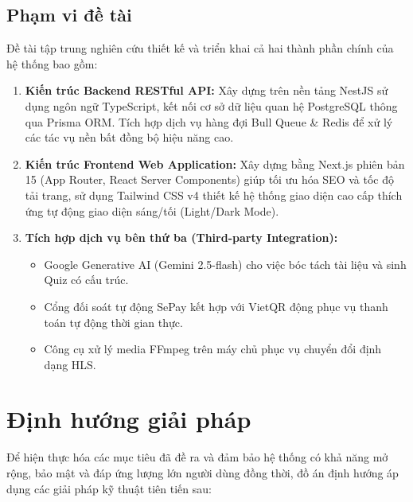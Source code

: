 \documentclass[../main.tex]{subfiles}
\begin{document}
\subsection{Phạm vi đề tài}
\label{subsec:PhamVi}

Đề tài tập trung nghiên cứu thiết kế và triển khai cả hai thành phần chính của hệ thống bao gồm:
\begin{enumerate}
    \item \textbf{Kiến trúc Backend RESTful API:} Xây dựng trên nền tảng NestJS sử dụng ngôn ngữ TypeScript, kết nối cơ sở dữ liệu quan hệ PostgreSQL thông qua Prisma ORM. Tích hợp dịch vụ hàng đợi Bull Queue & Redis để xử lý các tác vụ nền bất đồng bộ hiệu năng cao.
    \item \textbf{Kiến trúc Frontend Web Application:} Xây dựng bằng Next.js phiên bản 15 (App Router, React Server Components) giúp tối ưu hóa SEO và tốc độ tải trang, sử dụng Tailwind CSS v4 thiết kế hệ thống giao diện cao cấp thích ứng tự động giao diện sáng/tối (Light/Dark Mode).
    \item \textbf{Tích hợp dịch vụ bên thứ ba (Third-party Integration):}
    \begin{itemize}
        \item Google Generative AI (Gemini 2.5-flash) cho việc bóc tách tài liệu và sinh Quiz có cấu trúc.
        \item Cổng đối soát tự động SePay kết hợp với VietQR động phục vụ thanh toán tự động thời gian thực.
        \item Công cụ xử lý media FFmpeg trên máy chủ phục vụ chuyển đổi định dạng HLS.
    \end{itemize}
\end{enumerate}

\section{Định hướng giải pháp}
\label{sec:DinhHuongGiaiPhap}

Để hiện thực hóa các mục tiêu đã đề ra và đảm bảo hệ thống có khả năng mở rộng, bảo mật và đáp ứng lượng lớn người dùng đồng thời, đồ án định hướng áp dụng các giải pháp kỹ thuật tiên tiến sau:
\end{document}
